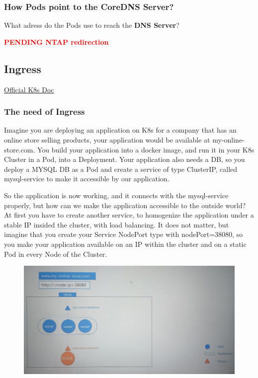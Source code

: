 \documentclass{article}
\begin{document}
\subsubsection{How Pods point to the CoreDNS Server?}

What adress do the Pods use to reach the \textbf{DNS Server}?

\textcolor{red}{\textbf{PENDING NTAP redirection}}

\subsection{Ingress}

\href{https://kubernetes.io/docs/concepts/services-networking/ingress/}{Official K8s Doc}

\subsubsection{The need of Ingress}

 Imagine you are deploying an application on K8s for a company that has an online store selling products, your application would be available at my-online-store.com. You build your application into a docker image, and run it in your K8s Cluster in a Pod, into a Deployment. Your application also needs a DB, so you deploy a MYSQL DB as a Pod and create a service of type ClusterIP, called mysql-service to make it accessible by our application.

 So the application is now working, and it connects with the mysql-service properly, but how can we make the application accessible to the outside world? At first you have to create another service, to homogenize the application under a stable IP insided the cluster, with load balancing. It does not matter, but imagine that you create your Service NodePort type with nodePort=38080, so you make your application available on an IP within the cluster and on a static Pod in every Node of the Cluster.

 \begin{figure}[H]
    \centering
    \includegraphics[width=\textwidth]{pictures/ingress4.png}
\end{figure}
\end{document}
